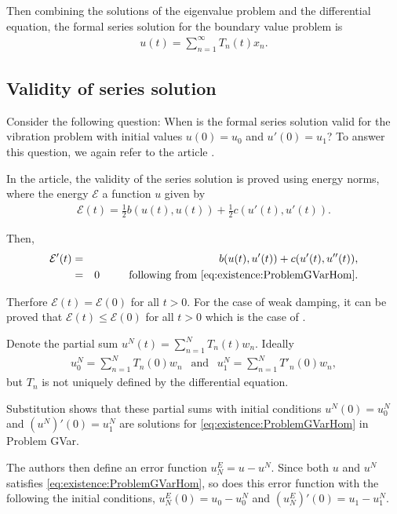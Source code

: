 \documentclass[../../main.tex]{subfiles}
\begin{document}
Then combining the solutions of the eigenvalue problem and the differential equation, the formal series solution for the boundary value problem is
\begin{eqnarray}
	u(t) = \sum_{n=1}^{\infty} T_n(t)x_n. \label{eq:1D_Model:ModalAnalysisSeriesSolution}
\end{eqnarray}


\subsection{Validity of series solution}
Consider the following question: When is the formal series solution valid for the vibration problem with initial values $u(0) = u_0$ and $u'(0) = u_1$? To answer this question, we again refer to the article \cite{CVV18}.

In the article, the validity of the series solution is proved using energy norms, where the energy $\mathcal{E}$ a function $u$ given by
\begin{eqnarray}
	\mathcal{E} (t) = \frac{1}{2} b(u(t), u(t)) + \frac{1}{2} c(u'(t), u'(t)). \label{eq:1D_Model:ModalAnalysisEnergy}
\end{eqnarray}

Then,
\begin{eqnarray*}
	\mathcal{E}'(t) & = & b(u(t), u'(t)) + c(u'(t), u''(t)),\\
					& = & 0 \ \ \ \ \ \ \ \textrm{ following from \eqref{eq:existence:ProblemGVarHom}}. 
\end{eqnarray*}

Therfore $\mathcal{E}(t) = \mathcal{E}(0)$ for all $t>0$. For the case of weak damping, it can be proved that $\mathcal{E}(t) \leq \mathcal{E}(0)$ for all $t>0$ which is the case of \cite{CVV18}.

Denote the partial sum $u^{N}(t) = \sum_{n=1}^{N} T_{n}(t)w_n$. Ideally
\begin{eqnarray*}
	u_0^{N} = \sum_{n=1}^{N} T_n(0) w_n \ \ \textrm{ and } \ \ u_{1}^{N} =\sum_{n=1}^{N} T'_n(0) w_n,
\end{eqnarray*}
but $T_n$ is not uniquely defined by the differential equation.

Substitution shows that these partial sums with initial conditions $u^N(0) = u^N_0$ and $(u^N)'(0) = u^N_1$ are solutions for \eqref{eq:existence:ProblemGVarHom} in Problem GVar.

The authors then define an error function $u^E_N = u - u^N$. Since both $u$ and $u^N$ satisfies \eqref{eq:existence:ProblemGVarHom}, so does this error function with the following the initial conditions, $u^E_N(0) = u_0 - u^N_0$ and $(u^E_N)'(0) = u_1 - u^N_1$.
\end{document}
